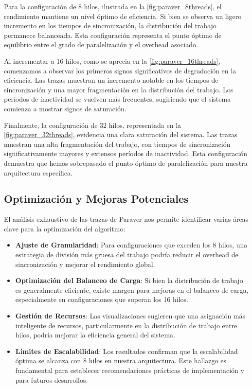 \documentclass[a4paper, 10pt, onecolumn]{IEEEtran}
\begin{document}
Para la configuración de 8 hilos, ilustrada en la \cref{fig:paraver_8threads}, el rendimiento mantiene un nivel óptimo de eficiencia. Si bien se observa un ligero incremento en los tiempos de sincronización, la distribución del trabajo permanece balanceada. Esta configuración representa el punto óptimo de equilibrio entre el grado de paralelización y el overhead asociado.

Al incrementar a 16 hilos, como se aprecia en la \cref{fig:paraver_16threads}, comenzamos a observar los primeros signos significativos de degradación en la eficiencia. Las trazas muestran un incremento notable en los tiempos de sincronización y una mayor fragmentación en la distribución del trabajo. Los períodos de inactividad se vuelven más frecuentes, sugiriendo que el sistema comienza a mostrar signos de saturación.

Finalmente, la configuración de 32 hilos, representada en la \cref{fig:paraver_32threads}, evidencia una clara saturación del sistema. Las trazas muestran una alta fragmentación del trabajo, con tiempos de sincronización significativamente mayores y extensos períodos de inactividad. Esta configuración demuestra que hemos sobrepasado el punto óptimo de paralelización para nuestra arquitectura específica.

\subsection{Optimización y Mejoras Potenciales}
El análisis exhaustivo de las trazas de Paraver nos permite identificar varias áreas clave para la optimización del algoritmo:

\begin{itemize}
  \item \textbf{Ajuste de Granularidad}: Para configuraciones que exceden los 8 hilos, una estrategia de división más gruesa del trabajo podría reducir el overhead de sincronización y mejorar el rendimiento global.
  
  \item \textbf{Optimización del Balanceo de Carga}: Si bien la distribución de trabajo es generalmente eficiente, existe margen para mejoras en el balanceo de carga, especialmente en configuraciones que superan los 16 hilos.
  
  \item \textbf{Gestión de Recursos}: Las visualizaciones sugieren que una asignación más inteligente de recursos, particularmente en la distribución de trabajo entre hilos, podría mejorar la eficiencia general del sistema.
  
  \item \textbf{Límites de Escalabilidad}: Los resultados confirman que la escalabilidad óptima se alcanza con 8 hilos en nuestra arquitectura. Este hallazgo es fundamental para establecer recomendaciones prácticas de implementación y para futuros desarrollos.
\end{itemize}
\end{document}
